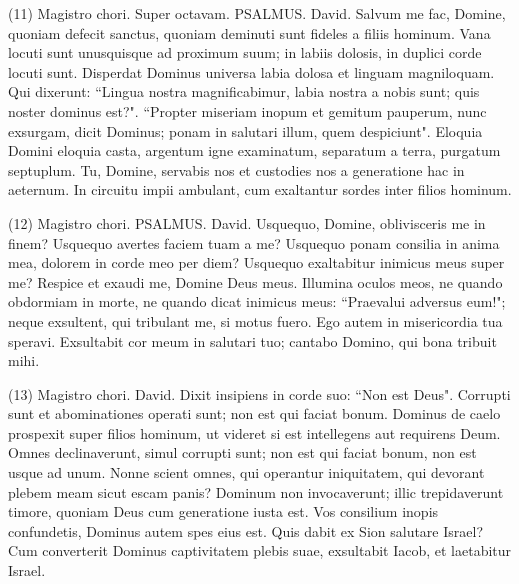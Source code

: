 \begin{biblechapter}  (11) 
\verse  Magistro chori. Super octavam. PSALMUS. David. 
\verse Salvum me fac, Domine, quoniam defecit sanctus, quoniam deminuti sunt fideles a filiis hominum. 
\verse Vana locuti sunt unusquisque ad proximum suum; in labiis dolosis, in duplici corde locuti sunt. 
\verse Disperdat Dominus universa labia dolosa et linguam magniloquam. 
\verse Qui dixerunt: “Lingua nostra magnificabimur, labia nostra a nobis sunt; quis noster dominus est?". 
\verse “Propter miseriam inopum et gemitum pauperum, nunc exsurgam, dicit Dominus; ponam in salutari illum, quem despiciunt". 
\verse Eloquia Domini eloquia casta, argentum igne examinatum, separatum a terra, purgatum septuplum. 
\verse Tu, Domine, servabis nos et custodies nos a generatione hac in aeternum. In circuitu impii ambulant, cum exaltantur sordes inter filios hominum. 
\end{biblechapter}

\begin{biblechapter}  (12) 
\verse  Magistro chori. PSALMUS. David. 
\verse Usquequo, Domine, oblivisceris me in finem? Usquequo avertes faciem tuam a me? 
\verse Usquequo ponam consilia in anima mea, dolorem in corde meo per diem? Usquequo exaltabitur inimicus meus super me? 
\verse Respice et exaudi me, Domine Deus meus. Illumina oculos meos, ne quando obdormiam in morte, 
\verse ne quando dicat inimicus meus: “Praevalui adversus eum!"; neque exsultent, qui tribulant me, si motus fuero. 
\verse Ego autem in misericordia tua speravi. Exsultabit cor meum in salutari tuo; cantabo Domino, qui bona tribuit mihi. 
\end{biblechapter}

\begin{biblechapter}  (13) 
\verse  Magistro chori. David. Dixit insipiens in corde suo: “Non est Deus". Corrupti sunt et abominationes operati sunt; non est qui faciat bonum. 
\verse Dominus de caelo prospexit super filios hominum, ut videret si est intellegens aut requirens Deum. 
\verse Omnes declinaverunt, simul corrupti sunt; non est qui faciat bonum, non est usque ad unum. 
\verse Nonne scient omnes, qui operantur iniquitatem, qui devorant plebem meam sicut escam panis? Dominum non invocaverunt; 
\verse illic trepidaverunt timore, quoniam Deus cum generatione iusta est. 
\verse Vos consilium inopis confundetis, Dominus autem spes eius est. 
\verse Quis dabit ex Sion salutare Israel? Cum converterit Dominus captivitatem plebis suae, exsultabit Iacob, et laetabitur Israel. 
\end{biblechapter}

